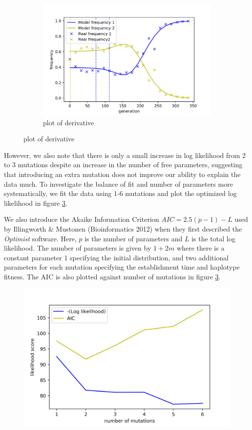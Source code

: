 \documentclass{article}
\begin{document}
\begin{figure}[h]
\begin{subfigure}[t]{0.30\linewidth}
		\includegraphics[width = 1.0\linewidth, trim={0 0 0 0}, clip=true]{fit_mut3.png}
		\caption{plot of derivative}
		\label{fig:mut3}
	\end{subfigure}
\end{figure}

However, we also note that there is only a small increase in log likelihood from 2 to 3 mutations despite an increase in the number of free parameters, suggesting that introducing an extra mutation does not improve our ability to explain the data much. To investigate the balance of fit and number of parameters more systematically, we fit the data using 1-6 mutations and plot the optimized log likelihood in figure \ref{fig:opt}.

We also introduce the Akaike Information Criterion $AIC = 2.5 (p-1)-L$ used by Illingworth \& Mustonen (Bioinformatics 2012) when they first described the \textit{Optimist} software. Here, $p$ is the number of parameters and $L$ is the total log likelihood.
The number of parameters is given by $1+2m$ where there is a constant parameter 1 specifying the initial distribution, and two additional parameters for each mutation specifying the establishment time and haplotype fitness. The AIC is also plotted against number of mutations in figure \ref{fig:opt}.

\begin{figure}[h]
		\centering
		\includegraphics[width = 0.6\linewidth, trim={0 0 0 0}, clip=true]{lls.png}
\label{fig:opt}
\end{figure}
\end{document}
